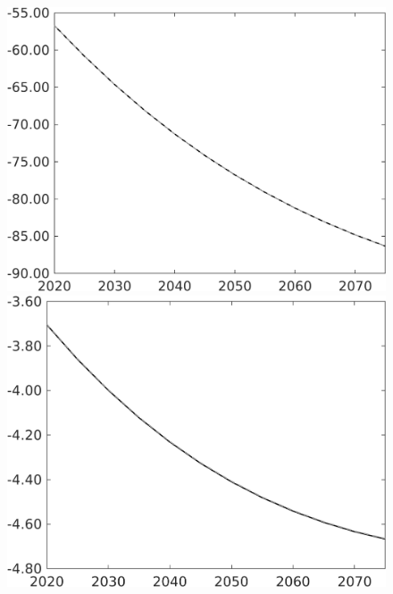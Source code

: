\documentclass[12pt]{article}
\begin{document}
\begin{figure}[h!!]
\begin{minipage}[]{0.32\textwidth}
	\end{minipage}	
	\begin{minipage}[]{0.32\textwidth}
		\includegraphics[width=1\textwidth]{../../codding_model/own_basedOnFried/optimalPol_010922_revision/figures/all_13Sept22/PerdifNoTauf_regime0_CompTaul_pgpftf_spillover0_nsk0_xgr0_knspil1_sep1_LFlimit0_emsbase0_countec0_GovRev0_etaa0.79_lgd0.png}
	\end{minipage}	
	\begin{minipage}[]{0.32\textwidth}
		\includegraphics[width=1\textwidth]{../../codding_model/own_basedOnFried/optimalPol_010922_revision/figures/all_13Sept22/PerdifNoTauf_regime0_CompTaul_pn_spillover0_nsk0_xgr0_knspil1_sep1_LFlimit0_emsbase0_countec0_GovRev0_etaa0.79_lgd0.png}

\end{minipage}
\end{figure}
\end{document}
